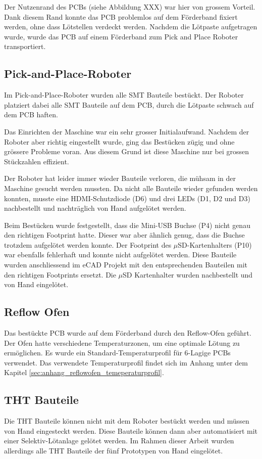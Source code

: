 Der Nutzenrand des PCBs (siehe Abbildung XXX) war hier von grossem Vorteil. Dank diesem Rand konnte das PCB problemlos auf dem Förderband fixiert werden, ohne dass Lötstellen verdeckt werden. Nachdem die Lötpaste aufgetragen wurde, wurde das PCB auf einem Förderband zum Pick and Place Roboter transportiert.


\subsection{Pick-and-Place-Roboter}
Im Pick-and-Place-Roboter wurden alle SMT Bauteile bestückt. Der Roboter platziert dabei alle SMT Bauteile auf dem PCB, durch die Lötpaste schwach auf dem PCB haften.

Das Einrichten der Maschine war ein sehr grosser Initialaufwand. Nachdem der Roboter aber richtig eingestellt wurde, ging das Bestücken zügig und ohne grössere Probleme voran. Aus diesem Grund ist diese Maschine nur bei grossen Stückzahlen effizient. 

Der Roboter hat leider immer wieder Bauteile verloren, die mühsam in der Maschine gesucht werden mussten. Da nicht alle Bauteile wieder gefunden werden konnten, musste eine HDMI-Schutzdiode (D6) und drei LEDs (D1, D2 und D3) nachbestellt und nachträglich von Hand aufgelötet werden.

Beim Bestücken wurde festgestellt, dass die Mini-USB Buchse (P4) nicht genau den richtigen Footprint hatte. Dieser war aber ähnlich genug, dass die Buchse trotzdem aufgelötet werden konnte. Der Footprint des $\mu$SD-Kartenhalters (P10) war ebenfalls fehlerhaft und konnte nicht aufgelötet werden. Diese Bauteile wurden anschliessend im eCAD Projekt mit den entsprechenden Bauteilen mit den richtigen Footprints ersetzt. Die $\mu$SD Kartenhalter wurden nachbestellt und von Hand eingelötet.


\subsection{Reflow Ofen}
Das bestückte PCB wurde auf dem Förderband durch den Reflow-Ofen geführt. Der Ofen hatte verschiedene Temperaturzonen, um eine optimale Lötung zu ermöglichen. Es wurde ein Standard-Temperaturprofil für 6-Lagige PCBs verwendet. Das verwendete Temperaturprofil findet sich im Anhang unter dem Kapitel \ref{sec:anhang_reflowofen_temeperaturprofil}.


\subsection{THT Bauteile}
Die THT Bauteile können nicht mit dem Roboter bestückt werden und müssen von Hand eingesteckt werden. Diese Bauteile können dann aber automatisiert mit einer Selektiv-Lötanlage gelötet werden. Im Rahmen dieser Arbeit wurden allerdings alle THT Bauteile der fünf Prototypen von Hand eingelötet.

